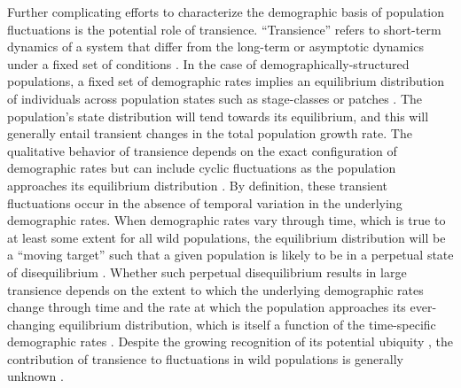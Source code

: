 \documentclass[11pt]{article}
\begin{document}
Further complicating efforts to characterize the demographic basis 
of population fluctuations is the potential role of transience.
``Transience'' refers to short-term dynamics of a system 
that differ from the long-term or asymptotic dynamics under a fixed set of conditions
\citep{hastings2010}.
In the case of demographically-structured populations,
a fixed set of demographic rates implies an equilibrium distribution
of individuals across population states such as stage-classes or patches
\citep{caswell2001matrix}.
The population's state distribution will tend towards its equilibrium,
and this will generally entail transient changes 
in the total population growth rate.
The qualitative behavior of transience depends
on the exact configuration of demographic rates
but can include cyclic fluctuations 
as the population approaches its equilibrium distribution
\citep{caswell2001matrix}.
By definition, these transient fluctuations occur in the absence 
of temporal variation in the underlying demographic rates.
When demographic rates vary through time,
which is true to at least some extent for all wild populations,
the equilibrium distribution will be a ``moving target''
such that a given population is likely to be in a perpetual state of disequilibrium
\citep{fox2000population, koons2017understanding}.
Whether such perpetual disequilibrium results in large transience 
depends on the extent to which the underlying demographic rates change through time
and the rate at which the population approaches its ever-changing equilibrium distribution,
which is itself a function of the time-specific demographic rates
\citep{caswell2005reactivity, caswell2007sensitivity}.
Despite the growing recognition of its potential ubiquity
\citep{caswell2007sensitivity, koons2017understanding},
the contribution of transience to fluctuations in wild populations is generally unknown
\citep[but see][]{hoy2020fluctuations}.
\end{document}
